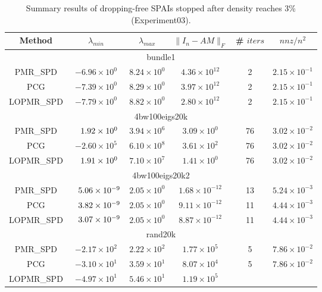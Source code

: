 \documentclass[numbers,webpdf,imanum]{ima-authoring-template}%
\theoremstyle{thmstyletwo}%
\numberwithin{equation}{section}
\begin{document}
\begin{table}
\caption{Summary results of dropping-free SPAIs stopped after density reaches 3\% (Experiment03).}
\label{tab:dropping-free-summary}
\begin{tabular}{cccccc}
\toprule
Method & $\lambda_{min}$                  & $\lambda_{max}$     & $\|I_n-AM\|_F$ 
& \# $iters$ & $nnz/n^2$\\
\midrule
\multicolumn{6}{c}{bundle1}\\
PMR\_SPD 
& $-6.96\times 10^{0}$ & $8.24\times 10^{0}$ & $4.36\times 10^{12}$ & 2 & $2.15\times 10^{-1}$\\
PCG
& $-7.39\times 10^{0}$ & $8.29\times 10^{0}$ & $3.97\times 10^{12}$ & 2 & $2.15\times 10^{-1}$\\
LOPMR\_SPD
& $-7.79\times 10^{0}$ & $8.82\times 10^{0}$ & $2.80\times 10^{12}$ & 2 & $2.15\times 10^{-1}$\\
\midrule
\multicolumn{6}{c}{4bw100eigs20k}\\
PMR\_SPD    & $\hphantom{-}1.92\times 10^{0}$  & $3.94\times 10^{6}$ & $3.09\times 10^0$    
& 76   & $3.02\times 10^{-2}$\\
PCG    & $-2.60\times 10^{5}$             & $6.10\times 10^{8}$ & $3.61\times 10^{2}$  
& 76 & $3.02\times 10^{-2}$\\
LOPMR\_SPD  & $\hphantom{-}1.91\times 10^{0}$  & $7.10\times 10^{7}$ & $1.41\times 10^0$    
& 76 & $3.02\times 10^{-2}$\\
\midrule
\multicolumn{6}{c}{4bw100eigs20k2}\\
PMR\_SPD & $\hphantom{-}5.06\times 10^{-9}$ & $2.05\times 10^{0}$ & $1.68\times 10^{-12}$ 
& 13  & $5.24\times 10^{-3}$\\
PCG    & $\hphantom{-}3.82\times 10^{-9}$ & $2.05\times 10^{0}$ & $9.11\times 10^{-12}$ 
& 11    & $4.44\times 10^{-3}$\\
LOPMR\_SPD  & $\hphantom{-}3.07\times 10^{-9}$ & $2.05\times 10^{0}$ &$8.87\times 10^{-12}$ 
& 11    & $4.44\times 10^{-3}$\\
\midrule
\multicolumn{6}{c}{rand20k}\\
PMR\_SPD & $-2.17\times 10^{2}$           & $2.22\times 10^{2}$ & $1.77\times 10^5$ 
& 5    & $7.86\times 10^{-2}$\\
PCG    & $-3.10\times 10^{1}$             & $3.59\times 10^{1}$ & $8.07\times 10^4$ 
& 5    & $7.86\times 10^{-2}$\\
LOPMR\_SPD  & $-4.97\times 10^{1}$             & $5.46\times 10^{1}$ & $1.19\times 10^5$ 

\end{tabular}
\end{table}
\end{document}
